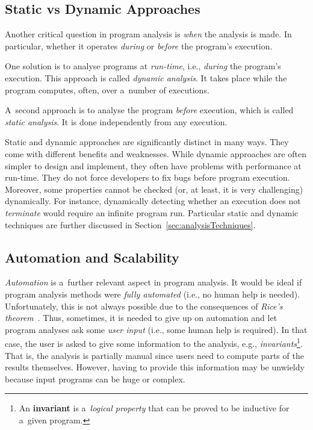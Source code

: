 \subsection{Static vs Dynamic Approaches}

Another critical question in program analysis is \emph{when} the analysis is made. In particular, whether it operates \emph{during} or \emph{before} the program's execution.

One solution is to analyse programs at \emph{run-time}, i.e., \emph{during} the program's execution. This approach is called \emph{dynamic analysis}. It takes place while the program computes, often, over a~number of executions.

A~second approach is to analyse the program \emph{before} execution, which is called \emph{static analysis}. It is done independently from any execution.

Static and dynamic approaches are significantly distinct in many ways. They come with different benefits and weaknesses. While dynamic approaches are often simpler to design and implement, they often have problems with performance at run-time. They do not force developers to fix bugs before program execution. Moreover, some properties cannot be checked (or, at least, it is very challenging) dynamically. For instance, dynamically detecting whether an execution does not \emph{terminate} would require an infinite program run. Particular static and dynamic techniques are further discussed in Section~\ref{sec:analysisTechniques}.

\subsection{Automation and Scalability}

\emph{Automation} is a~further relevant aspect in program analysis. It would be ideal if program analysis methods were \emph{fully automated} (i.e., no human help is needed). Unfortunately, this is not always possible due to the consequences of \emph{Rice's theorem}~\cite{rice}. Thus, sometimes, it is needed to give up on automation and let program analyses ask some \emph{user input} (i.e., some human help is required). In that case, the user is asked to give some information to the analysis, e.g., \emph{invariants}\footnote{An \textbf{invariant} is a~\emph{logical property} that can be proved to be inductive for a~given program.}. That is, the analysis is partially manual since users need to compute parts of the results themselves. However, having to provide this information may be unwieldy because input programs can be huge or complex.

